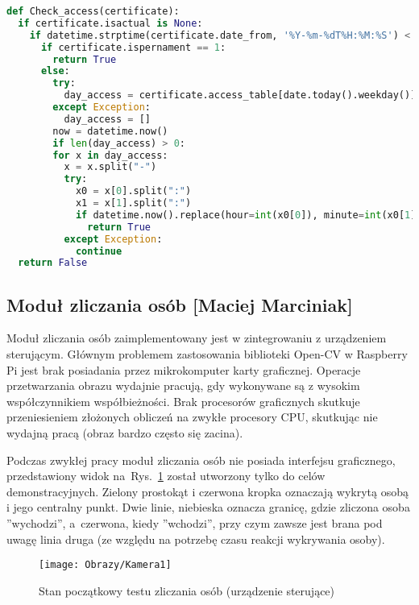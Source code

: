 \documentclass[twoside,10pt]{article}
\def\StudentA     {Maciej Marciniak}
\begin{document}
{\footnotesize 
\begin{lstlisting}[caption={Funkcja Check-access urządzenia sterującego}, label={lst:RPI check access}, language=Python]
def Check_access(certificate):
  if certificate.isactual is None:
    if datetime.strptime(certificate.date_from, '%Y-%m-%dT%H:%M:%S') < datetime.now() < datetime.strptime( certificate.date_to, '%Y-%m-%dT%H:%M:%S'):
      if certificate.ispernament == 1:
        return True
      else:
        try:
          day_access = certificate.access_table[date.today().weekday()].split(";")
        except Exception:
          day_access = []
        now = datetime.now()
        if len(day_access) > 0:
        for x in day_access:
          x = x.split("-")
          try:
            x0 = x[0].split(":")
            x1 = x[1].split(":")
            if datetime.now().replace(hour=int(x0[0]), minute=int(x0[1])) <= now < datetime.now().replace(hour=int(x1[0]), minute=int(x1[1])):
              return True
          except Exception:
            continue
  return False
\end{lstlisting}}
\newpage
\subsection{Moduł zliczania osób [\StudentA]}
Moduł zliczania osób zaimplementowany jest w zintegrowaniu z urządzeniem sterującym. Głównym problemem zastosowania biblioteki Open-CV w Raspberry Pi jest brak posiadania przez mikrokomputer karty graficznej. Operacje przetwarzania obrazu wydajnie pracują, gdy wykonywane są z wysokim współczynnikiem współbieżności. Brak procesorów graficznych skutkuje przeniesieniem złożonych obliczeń na zwykłe procesory CPU, skutkując nie wydajną pracą (obraz bardzo często się zacina). 

Podczas zwykłej pracy moduł zliczania osób nie posiada interfejsu graficznego, przedstawiony widok na~Rys.~\ref{rys:Zliczanie osob} został utworzony tylko do celów demonstracyjnych. Zielony prostokąt i czerwona kropka oznaczają wykrytą osobą i jego centralny punkt. Dwie linie, niebieska oznacza granicę, gdzie zliczona osoba ''wychodzi'', a~czerwona, kiedy ''wchodzi'', przy czym zawsze jest brana pod uwagę linia druga (ze względu na potrzebę czasu reakcji wykrywania osoby).

\begin{figure}[ht!]
\centering
\texttt{[image: Obrazy/Kamera1]}
\caption{Stan początkowy testu zliczania osób (urządzenie sterujące)}
\label{rys:Zliczanie osob}
\end{figure}
\end{document}
